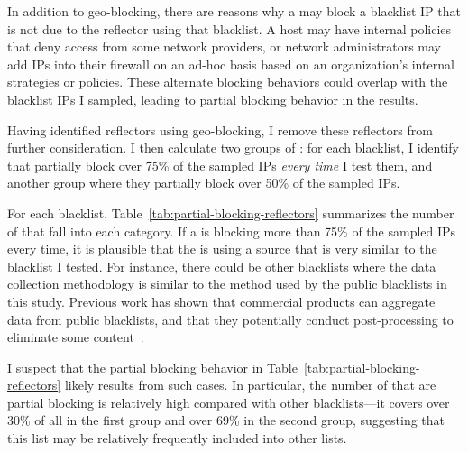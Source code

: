 In addition to geo-blocking, there are reasons why a {} may
block a blacklist IP that is not due to the reflector using that
blacklist.  A host may have internal policies that deny access from
some network providers, or network administrators may add IPs into
their firewall on an ad-hoc basis based on an organization's internal
strategies or policies.  These alternate blocking behaviors could
overlap with the blacklist IPs I sampled, leading to partial blocking
behavior in the results.

Having identified reflectors using geo-blocking, I remove these
reflectors from further consideration.  I then calculate two groups of
{}: for each blacklist, I identify {} that
partially block over 75\% of the sampled IPs \textit{every time} I
test them, and another group where they partially block over 50\% of
the sampled IPs.


For each blacklist, Table~\ref{tab:partial-blocking-reflectors}
summarizes the number of {} that fall into each category.
If a {} is blocking more than 75\% of the sampled IPs every
time, it is plausible that the {} is using a source that is
very similar to the blacklist I tested.  For instance, there could be
other blacklists where the data collection methodology is similar to
the method used by the public blacklists in this study.  Previous work
has shown that commercial products can aggregate data from public
blacklists, and that they potentially conduct post-processing to
eliminate some content~\cite{li2019reading}.

I suspect that the partial blocking behavior in
Table~\ref{tab:partial-blocking-reflectors} likely results from such
cases.  In particular, the number of {} that are partial
blocking {\dshieldtop} is relatively high compared with other
blacklists---it covers over 30\% of all {} in the first
group and over 69\% in the second group, suggesting that this list may
be relatively frequently included into other lists.
